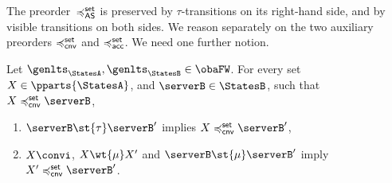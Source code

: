 

\newcommand{\completewrt}[2]{\ensuremath{\mathsf{cwrt} \, (#1,#2)}}

The preorder~$\mathrel{\preccurlyeq^{\mathsf{set}}_{\mathsf{AS}}}$ is preserved by $\tau$-transitions on
its right-hand side, and by visible transitions
on both sides.
We reason separately on the two auxiliary
preorders $\mathrel{\preccurlyeq^{\mathsf{set}}_{\mathsf{cnv}}}$ and $\mathrel{\preccurlyeq^{\mathsf{set}}_{\mathsf{acc}}}$.
We need one
further notion.
\begin{lemma}
  \label{lem:bhvleqone-preserved}
  Let $\genlts_\StatesA, \genlts_\StatesB \in \obaFW$.
  For every set $X \in \pparts{ \StatesA }$, and
  $\serverB \in \StatesB$, such that
  $X \cnvleqset \serverB$,
  \begin{enumerate}
  \item\label{pt:bhvleqone-preserved-by-tau}
    $\serverB \st{ \tau } \serverB'$ implies $X \cnvleqset \serverB'$,
  \item\label{pt:bhvleqone-preserved-by-mu}
    $X \convi$, $X \wt{\mu} X'$ and $\serverB \st{\mu} \serverB'$ imply $X' \cnvleqset \serverB'$.
  \end{enumerate}
\end{lemma}


